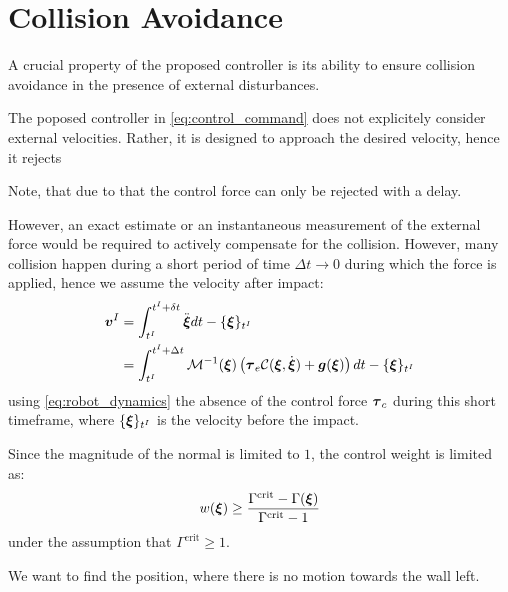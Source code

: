 \section{Collision Avoidance} \label{sec:collision_avoidance}

A crucial property of the proposed controller is its ability to ensure collision avoidance in the presence of external disturbances.

The poposed controller in \eqref{eq:control_command} does not explicitely consider external velocities. Rather, it is designed to approach the desired velocity, hence it rejects 

Note, that due to that the control force can only be rejected with a delay.

However, an exact estimate or an instantaneous measurement of the external force would be required to actively compensate for the collision.
However, many collision happen during a short period of time $\Delta t \rightarrow 0$ during which the force is applied, hence we assume the velocity after impact:
\begin{align}
	\boldsymbol{v}^I 
	 & = \int_{t^I}^{t^I + \delta t} \ddot{\boldsymbol{\xi}} dt - \{ \boldsymbol{\xi} \}_{t^I} \\
	 & = \int_{t^I}^{t^I + \Delta t} \mathcal{M}^{-1}(\boldsymbol{\xi})  \left( \boldsymbol{\tau}_e \mathcal{C}(\boldsymbol{\xi}, \dot{\boldsymbol{\xi}}) + \boldsymbol{g}(\boldsymbol{\xi}) \right) dt - \{\boldsymbol{\xi} \}_{t^I} \nonumber
\end{align}
using \eqref{eq:robot_dynamics} the absence of the control force $\boldsymbol{\tau}_c$ during this short timeframe, where $\{\boldsymbol{\xi} \}_{t^I}$ is the velocity before the impact.
 
Since the magnitude of the normal is limited to $1$, the control weight is limited as: 
\begin{equation}
w(\boldsymbol{\xi}) \geq \frac{\Gamma^{\mathrm{crit}} - \Gamma(\boldsymbol{\xi})}{\Gamma^{\mathrm{crit}} - 1}
\end{equation}
under the assumption that $\Gamma^{\mathrm{crit}} \geq 1$.

We want to find the position, where there is no motion towards the wall left.

